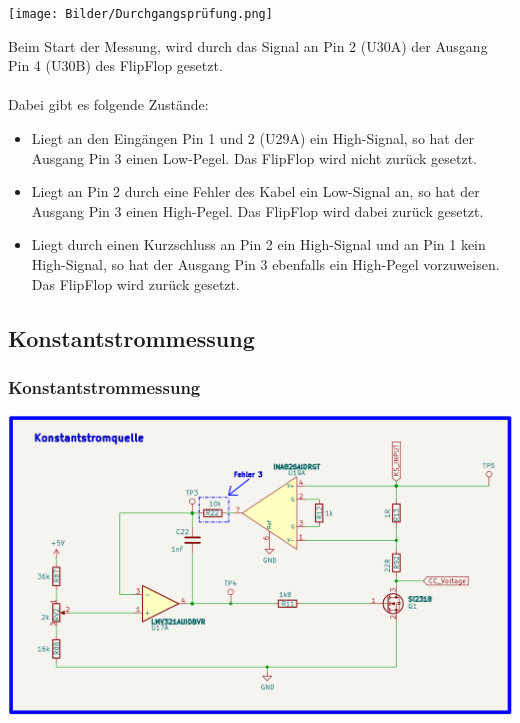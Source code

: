 \begin{center}
\texttt{[image: Bilder/Durchgangsprüfung.png]}
\end{center}

Beim Start der Messung, wird durch das Signal an Pin 2 (U30A) der Ausgang Pin 4 (U30B) des FlipFlop gesetzt. 
\\
\\
Dabei gibt es folgende Zustände:

\begin{itemize}
	\item{Liegt an den Eingängen Pin 1 und 2 (U29A) ein High-Signal,  so hat der Ausgang Pin 3 einen Low-Pegel. Das FlipFlop wird nicht zurück gesetzt.}
	
	\item{Liegt an Pin 2 durch eine Fehler des Kabel ein Low-Signal an, so hat der Ausgang Pin 3 einen High-Pegel. Das FlipFlop wird dabei zurück gesetzt.}
	
	\item{Liegt durch einen Kurzschluss an Pin 2 ein High-Signal und an Pin 1 kein High-Signal, so hat der Ausgang Pin 3 ebenfalls ein High-Pegel vorzuweisen. Das FlipFlop wird zurück gesetzt.}
\end{itemize}

\newpage
\subsection{Konstantstrommessung}

\subsubsection{Konstantstrommessung}
\begin{center}
\includegraphics[width=16cm]{Bilder/Konstantstromquelle.png}
\end{center}

